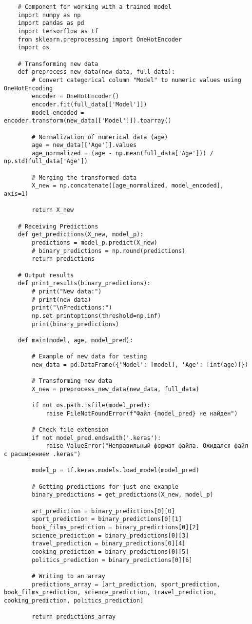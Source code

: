 \begin{lstlisting}
    # Component for working with a trained model
    import numpy as np
    import pandas as pd
    import tensorflow as tf
    from sklearn.preprocessing import OneHotEncoder
    import os

    # Transforming new data
    def preprocess_new_data(new_data, full_data):
        # Convert categorical column "Model" to numeric values ​​using OneHotEncoding
        encoder = OneHotEncoder()
        encoder.fit(full_data[['Model']])
        model_encoded = encoder.transform(new_data[['Model']]).toarray()
        
        # Normalization of numerical data (age)
        age = new_data[['Age']].values
        age_normalized = (age - np.mean(full_data['Age'])) / np.std(full_data['Age'])

        # Merging the transformed data
        X_new = np.concatenate([age_normalized, model_encoded], axis=1)
        
        return X_new

    # Receiving Predictions
    def get_predictions(X_new, model_p):
        predictions = model_p.predict(X_new)
        # binary_predictions = np.round(predictions)
        return predictions

    # Output results
    def print_results(binary_predictions):
        # print("New data:")
        # print(new_data)
        print("\nPredictions:")
        np.set_printoptions(threshold=np.inf)
        print(binary_predictions)

    def main(model, age, model_pred):
        
        # Example of new data for testing
        new_data = pd.DataFrame({'Model': [model], 'Age': [int(age)]})

        # Transforming new data
        X_new = preprocess_new_data(new_data, full_data)

        if not os.path.isfile(model_pred):
            raise FileNotFoundError(f"Файл {model_pred} не найден")

        # Check file extension
        if not model_pred.endswith('.keras'):
            raise ValueError("Неправильный формат файла. Ожидался файл с расширением .keras")

        model_p = tf.keras.models.load_model(model_pred)

        # Getting predictions for just one example
        binary_predictions = get_predictions(X_new, model_p)

        art_prediction = binary_predictions[0][0]
        sport_prediction = binary_predictions[0][1]
        book_films_prediction = binary_predictions[0][2]
        science_prediction = binary_predictions[0][3]
        travel_prediction = binary_predictions[0][4]
        cooking_prediction = binary_predictions[0][5]
        politics_prediction = binary_predictions[0][6]

        # Writing to an array
        predictions_array = [art_prediction, sport_prediction, book_films_prediction, science_prediction, travel_prediction, cooking_prediction, politics_prediction]

        return predictions_array
\end{lstlisting}

